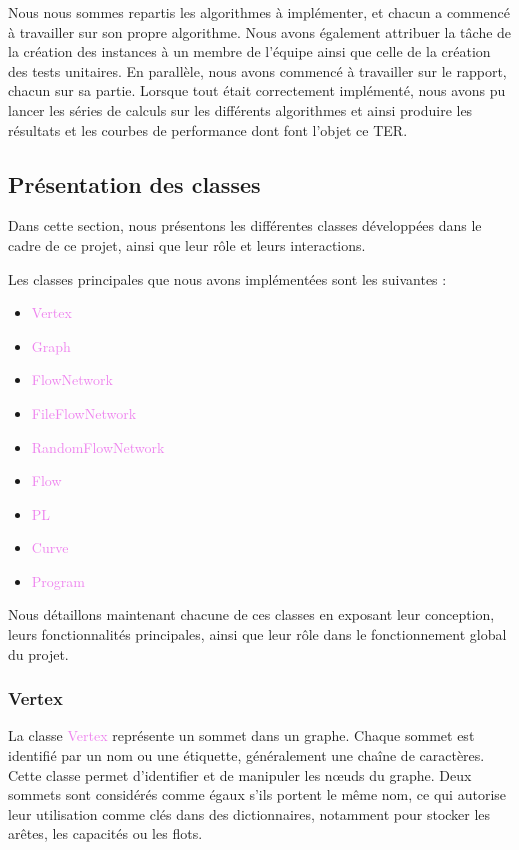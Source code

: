 \documentclass[a4paper]{article}
\begin{document}
Nous nous sommes repartis les algorithmes à implémenter, et chacun a commencé à travailler sur son propre algorithme. Nous avons également attribuer la tâche de la création des instances à un membre de l'équipe ainsi que celle de la création des tests unitaires. En parallèle, nous avons commencé à travailler sur le rapport, chacun sur sa partie. Lorsque tout était correctement implémenté, nous avons pu lancer les séries de calculs sur les différents algorithmes et ainsi produire les résultats et les courbes de performance dont font l'objet ce TER.
\subsection{Présentation des classes}

Dans cette section, nous présentons les différentes classes développées dans le cadre de ce projet, ainsi que leur rôle et leurs interactions.

Les classes principales que nous avons implémentées sont les suivantes :

\begin{itemize}
    \item \textcolor{violet}{Vertex}
    \item \textcolor{violet}{Graph}
    \item \textcolor{violet}{FlowNetwork}
    \item \textcolor{violet}{FileFlowNetwork}
    \item \textcolor{violet}{RandomFlowNetwork}
    \item \textcolor{violet}{Flow}
    \item \textcolor{violet}{PL}
    \item \textcolor{violet}{Curve}
    \item \textcolor{violet}{Program}
\end{itemize}

Nous détaillons maintenant chacune de ces classes en exposant leur conception, leurs fonctionnalités principales, ainsi que leur rôle dans le fonctionnement global du projet.

\subsubsection{Vertex}

La classe \textcolor{violet}{Vertex} représente un sommet dans un graphe. Chaque sommet est identifié par un nom ou une étiquette, généralement une chaîne de caractères. Cette classe permet d'identifier et de manipuler les nœuds du graphe. Deux sommets sont considérés comme égaux s'ils portent le même nom, ce qui autorise leur utilisation comme clés dans des dictionnaires, notamment pour stocker les arêtes, les capacités ou les flots.
\end{document}
